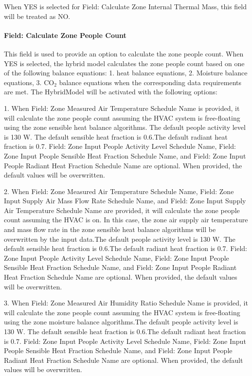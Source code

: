 When YES is selected for Field: Calculate Zone Internal Thermal Mass, this field will be treated as NO.

\paragraph{Field: Calculate Zone People Count}\label{field-calculate-zone-people-count-rate-hm}
This field is used to provide an option to calculate the zone people count.
When YES is selected, the hybrid model calculates the zone people count based on one of the following balance equations: 1. heat balance equations, 2. Moisture balance equations, 3. CO$_2$ balance equations when the corresponding data requirements are met. The HybridModel will be activated with the following options:


1. When Field: Zone Measured Air Temperature Schedule Name is provided, it will calculate the zone people count assuming the HVAC system is free-floating using the zone sensible heat balance algorithms. The default people activity level is 130 W. The default sensible heat fraction is 0.6.The default radiant heat fraction is 0.7. Field: Zone Input People Activity Level Schedule Name, Field: Zone Input People Sensible Heat Fraction Schedule Name, and Field: Zone Input People Radiant Heat Fraction Schedule Name are optional. When provided, the default values will be overwritten.

2. When Field: Zone Measured Air Temperature Schedule Name, Field: Zone Input Supply Air Mass Flow Rate Schedule Name, and Field: Zone Input Supply Air Temperature Schedule Name are provided, it will calculate the zone people count assuming the HVAC is on. In this case, the zone air supply air temperature and mass flow rate in the zone sensible heat balance algorithms will be overwritten by the input data.The default people activity level is 130 W. The default sensible heat fraction is 0.6.The default radiant heat fraction is 0.7. Field: Zone Input People Activity Level Schedule Name, Field: Zone Input People Sensible Heat Fraction Schedule Name, and Field: Zone Input People Radiant Heat Fraction Schedule Name are optional. When provided, the default values will be overwritten.

3. When Field: Zone Measured Air Humidity Ratio Schedule Name is provided, it will calculate the zone people count assuming the HVAC system is free-floating using the zone moisture balance algorithms.The default people activity level is 130 W. The default sensible heat fraction is 0.6.The default radiant heat fraction is 0.7. Field: Zone Input People Activity Level Schedule Name, Field: Zone Input People Sensible Heat Fraction Schedule Name, and Field: Zone Input People Radiant Heat Fraction Schedule Name are optional. When provided, the default values will be overwritten.


